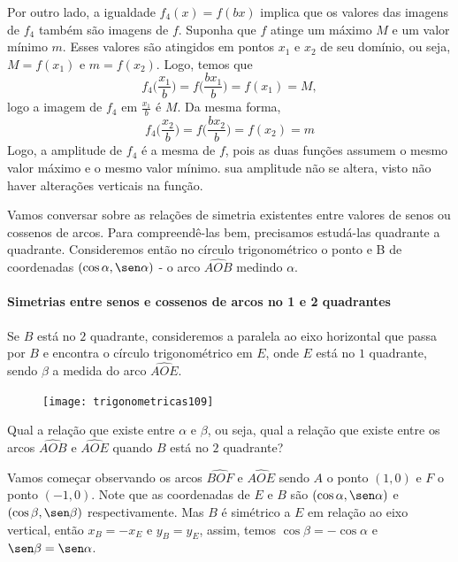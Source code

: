 Por outro lado, a igualdade $f_4(x) = f(bx)$ implica que os valores das imagens de $f_4$ também são imagens de $f$. Suponha que $f$ atinge um máximo $M$ e um valor mínimo $m$. Esses valores são atingidos em pontos $x_1$ e $x_2$ de seu domínio, ou seja, $M = f(x_1)$ e $m = f(x_2)$. Logo, temos que 
\begin{equation*}
f_4\bigg(\frac{x_1}{b}\bigg)=f\bigg(\frac{bx_1}{b}\bigg)=f(x_1)=M,
\end{equation*}
logo a imagem de $f_4$ em $\frac{x_1}{b}$ é $M$. Da mesma forma, 
\begin{equation*}
f_4\bigg(\frac{x_2}{b}\bigg)=f\bigg(\frac{bx_2}{b}\bigg)=f(x_2)=m
\end{equation*}
Logo, a amplitude de $f_4$ é a mesma de $f$, pois as duas funções assumem o mesmo valor máximo e o mesmo valor mínimo. sua amplitude não se altera, visto não haver alterações verticais na função.


Vamos conversar sobre as relações de simetria existentes entre valores de senos ou cossenos de arcos. Para compreendê-las bem, precisamos estudá-las quadrante a quadrante. Consideremos então no círculo trigonométrico o ponto e B de coordenadas $(\cos\alpha, \sen\alpha)$ - o arco $\widehat{AOB}$ medindo $\alpha$.

\paragraph{Simetrias entre senos e cossenos de arcos no 1 e 2 quadrantes}

Se $B$ está no $2$ quadrante, consideremos a paralela ao eixo horizontal que passa por $B$ e encontra o círculo trigonométrico em $E$, onde $E$ está no $1$ quadrante, sendo $\beta$ a medida do arco $\widehat{AOE}$.

\begin{figure}[H]
\centering

\texttt{[image: trigonometricas109]}
\end{figure}

Qual a relação que existe entre $\alpha$ e $\beta$, ou seja, qual a relação que existe entre os arcos $\widehat{AOB}$ e $\widehat{AOE}$ quando $B$ está no $2$ quadrante?

Vamos começar observando os arcos $\widehat{BOF}$ e $\widehat{AOE}$ sendo $A$ o ponto $(1,0)$ e $F$ o ponto $(-1,0)$. Note que as coordenadas de $E$ e $B$ são $(\cos\alpha, \sen\alpha)$ e $(\cos\beta, \sen\beta)$ respectivamente. Mas $B$ é simétrico a $E$ em relação ao eixo vertical, então $x_B = - x_E \text{ e } y_B = y_E$, assim, temos $\cos\beta = - \cos\alpha$ e  $\sen\beta = \sen\alpha$.

